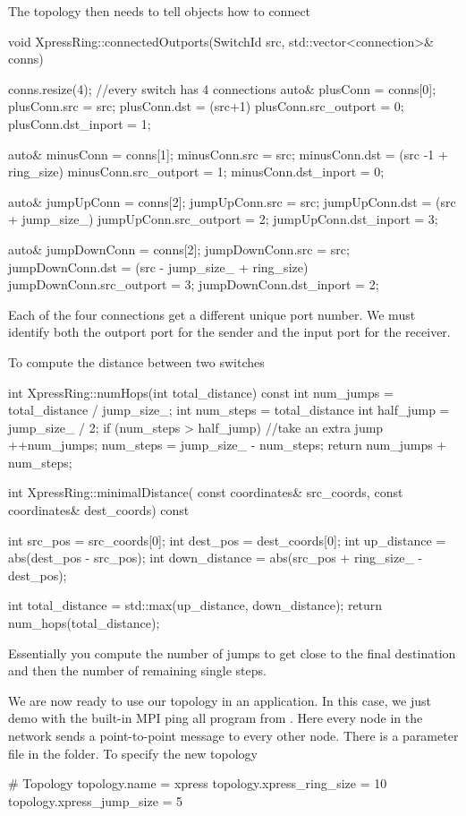 The topology then needs to tell objects how to connect

\begin{CppCode}
void XpressRing::connectedOutports(SwitchId src, std::vector<connection>& conns)
{
  conns.resize(4); //every switch has 4 connections
  auto& plusConn = conns[0];
  plusConn.src = src;
  plusConn.dst = (src+1) %
  plusConn.src_outport = 0;
  plusConn.dst_inport = 1; 
  
  auto& minusConn = conns[1];
  minusConn.src = src;
  minusConn.dst = (src -1 + ring_size) %
  minusConn.src_outport = 1;
  minusConn.dst_inport = 0;   
  
  auto& jumpUpConn = conns[2];
  jumpUpConn.src = src;
  jumpUpConn.dst = (src + jump_size_) %
  jumpUpConn.src_outport = 2;
  jumpUpConn.dst_inport = 3;
  
  auto& jumpDownConn = conns[2];
  jumpDownConn.src = src;
  jumpDownConn.dst = (src - jump_size_ + ring_size) %
  jumpDownConn.src_outport = 3;
  jumpDownConn.dst_inport = 2;
}
\end{CppCode}
Each of the four connections get a different unique port number.  
We must identify both the outport port for the sender and the input port for the receiver.

To compute the distance between two switches

\begin{CppCode}
int XpressRing::numHops(int total_distance) const
{
  int num_jumps = total_distance / jump_size_;
  int num_steps = total_distance %
  int half_jump = jump_size_ / 2;
  if (num_steps > half_jump) {
    //take an extra jump
    ++num_jumps;
    num_steps = jump_size_ - num_steps;
  }
  return num_jumps + num_steps;
}

int
XpressRing::minimalDistance(
  const coordinates& src_coords,
  const coordinates& dest_coords) const
{
  int src_pos = src_coords[0];
  int dest_pos = dest_coords[0];
  int up_distance = abs(dest_pos - src_pos);
  int down_distance = abs(src_pos + ring_size_ - dest_pos);

  int total_distance = std::max(up_distance, down_distance);
  return num_hops(total_distance);
}
\end{CppCode}
Essentially you compute the number of jumps to get close to the final destination and then the number of remaining single steps.

We are now ready to use our topology in an application.
In this case, we just demo with the built-in MPI ping all program from \sstmacro.
Here every node in the network sends a point-to-point message to every other node.
There is a parameter file in the  folder.
To specify the new topology

\begin{ViFile}
# Topology
topology.name = xpress
topology.xpress_ring_size = 10
topology.xpress_jump_size = 5
\end{ViFile}



